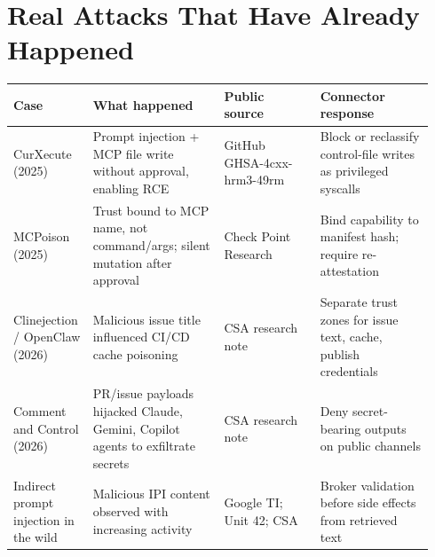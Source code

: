 \documentclass[10pt]{article}
\begin{document}
\section{Real Attacks That Have Already Happened}
\begin{longtable}{@{}p{0.16\linewidth}p{0.30\linewidth}p{0.22\linewidth}p{0.26\linewidth}@{}}
\toprule
\textbf{Case} & \textbf{What happened} & \textbf{Public source} & \textbf{Connector response} \\
\midrule
\endhead
CurXecute (2025) & Prompt injection + MCP file write without approval, enabling RCE & GitHub GHSA-4cxx-hrm3-49rm & Block or reclassify control-file writes as privileged syscalls \\
MCPoison (2025) & Trust bound to MCP name, not command/args; silent mutation after approval & Check Point Research & Bind capability to manifest hash; require re-attestation \\
Clinejection / OpenClaw (2026) & Malicious issue title influenced CI/CD cache poisoning & CSA research note & Separate trust zones for issue text, cache, publish credentials \\
Comment and Control (2026) & PR/issue payloads hijacked Claude, Gemini, Copilot agents to exfiltrate secrets & CSA research note & Deny secret-bearing outputs on public channels \\
Indirect prompt injection in the wild & Malicious IPI content observed with increasing activity & Google TI; Unit 42; CSA & Broker validation before side effects from retrieved text \\
\bottomrule
\end{longtable}
\end{document}
